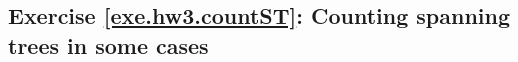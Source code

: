 \documentclass[numbers=enddot,12pt,final,onecolumn,notitlepage]{scrartcl}%
\theoremstyle{definition}
\newenvironment{proof}[1][Proof]{\noindent\textbf{#1.} }{\ \rule{0.5em}{0.5em}}
\newcommand{\set}[1]{\left\{ #1 \right\}}
\newcommand{\tup}[1]{\left( #1 \right)}
\begin{document}
% 

\newpage

\subsection{Exercise \ref{exe.hw3.countST}: Counting spanning trees in
some cases}
\end{document}
